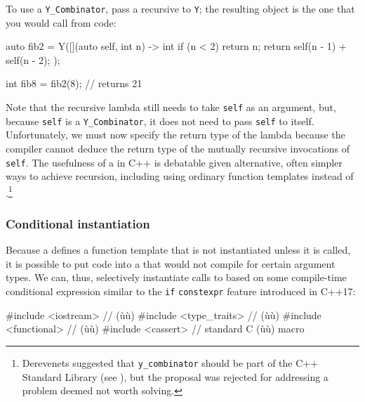 {To use a \lstinline!Y_Combinator!, pass a recursive  to \lstinline!Y!; the resulting object is the one that you would
call from code:

\begin{emcppslisting}[emcppsbatch=e6]
auto fib2 = Y([](auto self, int n) -> int
{
    if (n < 2) { return n; }
    return self(n - 1) + self(n - 2);
});

int fib8 = fib2(8);  // returns 21
\end{emcppslisting}
    

\noindent Note that the recursive lambda still needs to take \lstinline!self! as an
argument, but, because \lstinline!self! is a \lstinline!Y_Combinator!, it
does not need to pass \lstinline!self! to itself. Unfortunately, we must
now specify the return type of the lambda because the compiler cannot
deduce the return type of the mutually recursive invocations of
\lstinline!self!. The usefulness of a  in C++ is
debatable given alternative, often simpler ways to achieve recursion,
including using ordinary function templates instead of .{\cprotect\footnote{Derevenets suggested that
\lstinline!y_combinator! should be part of the C++ Standard Library (see
\cite{derevenets16}), but the proposal was rejected for addressing
  a problem deemed not worth solving.}}

\subsubsection[Conditional instantiation]{Conditional instantiation}\label{conditional-instantiation}

Because a  defines a function template that is
not instantiated unless it is called, it is possible to put code into a
 that would not compile for certain argument
types. We can, thus, selectively instantiate calls to  based on some compile-time conditional expression similar to
the \lstinline!if! \lstinline!constexpr! feature introduced in C++17:

\begin{emcppslisting}[emcppsbatch=e7,emcppsstandards={c++14}]
#include <iostream>     // (ù{}ù)
#include <type_traits>  // (ù{}ù)
#include <functional>   // (ù{}ù)
#include <cassert>      // standard C (ù{}ù) macro


\end{emcppslisting}}
